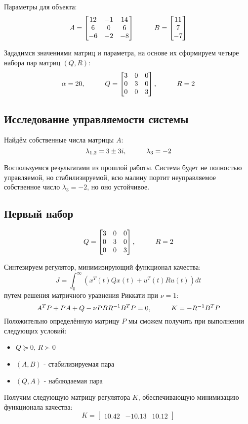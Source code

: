 Параметры для объекта:
$$
  A = \begin{bmatrix}
  12 & -1 & 14 \\
  6 & 0 & 6 \\
  -6 & -2 & -8 
  \end{bmatrix} \hspace*{1cm}
  B = \begin{bmatrix}
    11 \\ 7 \\ -7 
  \end{bmatrix}
$$

Зададимся значениями матриц и параметра, на основе их сформируем четыре набора пар матриц $(Q,R)$:
$$
  \alpha = 20, \hspace*{1cm} Q = \begin{bmatrix}
                        3 & 0 & 0 \\
                        0 & 3 & 0 \\
                        0 & 0 & 3 
                      \end{bmatrix}, \hspace*{1cm} R=2
$$

\subsection{Исследование управляемости системы}

Найдём собственные числа матрицы $A$:
$$
    \lambda_{1,2} = 3 \pm 3i, \hspace*{1cm} \lambda_3 = -2
$$

Воспользуемся результатами из прошлой работы. Система будет не полностью управляемой, но стабилизируемой, всю малину портит неуправляемое собственное число $\lambda_3 = -2$, но оно устойчивое.

\subsection{Первый набор}
$$
  Q = \begin{bmatrix}
                        3 & 0 & 0 \\
                        0 & 3 & 0 \\
                        0 & 0 & 3 
                      \end{bmatrix}, \hspace*{1cm} R=2
$$

Синтезируем регулятор, минимизирующий функционал качества:
$$
  J = \int_{0}^{\infty} (x^T(t)Q x(t) + u^T(t) R u(t))dt  
$$
путем решения матричного уравнения Риккати при $\nu = 1$:
$$
    A^T P + PA + Q - \nu PBR^{-1}B^T P = 0, \hspace*{1cm} K = -R^{-1}B^T P
$$
Положительно определённую матрицу $P$ мы сможем получить при выполнении следующих условий:
\begin{itemize}
  \item $Q \succeq 0$, $R \succ 0$
  \item $(A,B)$ - стабилизируемая пара
  \item $(Q, A)$ - наблюдаемая пара
\end{itemize}
Получим следующую матрицу регулятора $K$, обеспечивающую минимизацию функционала качества:
$$
   K = \begin{bmatrix} 10.42 & -10.13 &  10.12 \end{bmatrix}
$$

